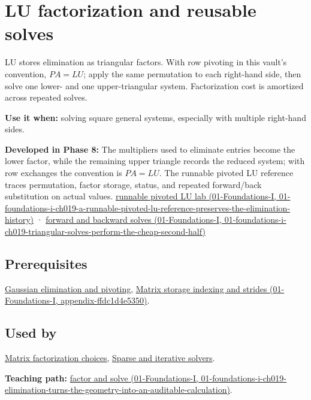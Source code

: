 \hypertarget{appendix-55e4b5b0a1e6}{}
\section{LU factorization and reusable solves}\label{appendix-55e4b5b0a1e6-lu-factorization-and-reusable-solves}

LU stores elimination as triangular factors. With row pivoting in this vault's convention, \(PA=LU\); apply the same permutation to each right-hand side, then solve one lower- and one upper-triangular system. Factorization cost is amortized across repeated solves.

\textbf{Use it when:} solving square general systems, especially with multiple right-hand sides.

\textbf{Developed in Phase 8:} The multipliers used to eliminate entries become the lower factor, while the remaining upper triangle records the reduced system; with row exchanges the convention is \(PA=LU\). The runnable pivoted LU reference traces permutation, factor storage, status, and repeated forward/back substitution on actual values. \href{../01-Foundations-I/main.pdf\#nameddest=01-foundations-i-ch019-a-runnable-pivoted-lu-reference-preserves-the-elimination-history}{runnable pivoted LU lab (01-Foundations-I, 01-foundations-i-ch019-a-runnable-pivoted-lu-reference-preserves-the-elimination-history)} · \href{../01-Foundations-I/main.pdf\#nameddest=01-foundations-i-ch019-triangular-solves-perform-the-cheap-second-half}{forward and backward solves (01-Foundations-I, 01-foundations-i-ch019-triangular-solves-perform-the-cheap-second-half)}

\subsection{Prerequisites}\label{appendix-55e4b5b0a1e6-prerequisites}

\hyperref[appendix-f6e77f4a200f]{Gaussian elimination and pivoting}, \href{../01-Foundations-I/main.pdf\#nameddest=appendix-ffdc1d4e5350}{Matrix storage indexing and strides (01-Foundations-I, appendix-ffdc1d4e5350)}.

\subsection{Used by}\label{appendix-55e4b5b0a1e6-used-by}

\hyperref[appendix-221a483bec2d]{Matrix factorization choices}, \hyperref[appendix-67c87a3d9e94]{Sparse and iterative solvers}.

\textbf{Teaching path:} \href{../01-Foundations-I/main.pdf\#nameddest=01-foundations-i-ch019-elimination-turns-the-geometry-into-an-auditable-calculation}{factor and solve (01-Foundations-I, 01-foundations-i-ch019-elimination-turns-the-geometry-into-an-auditable-calculation)}.
